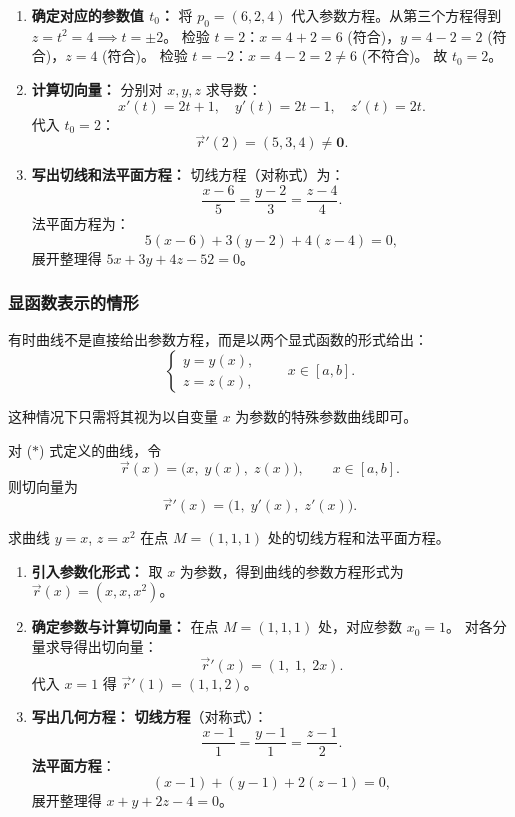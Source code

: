 \documentclass[lang=cn,11pt]{elegantbook}
\begin{document}
\begin{solution}
\begin{enumerate}
  \item \textbf{确定对应的参数值 $t_0$：}
  将 $p_0=(6,2,4)$ 代入参数方程。从第三个方程得到 $z=t^2=4 \implies t=\pm 2$。
  检验 $t=2$：$x=4+2=6$ (符合)，$y=4-2=2$ (符合)，$z=4$ (符合)。
  检验 $t=-2$：$x=4-2=2 \neq 6$ (不符合)。
  故 $t_0=2$。

  \item \textbf{计算切向量：}
  分别对 $x, y, z$ 求导数：
  \[
  x'(t)=2t+1,\quad y'(t)=2t-1,\quad z'(t)=2t.
  \]
  代入 $t_0=2$：
  \[
  \vec{r}'(2)=(5,3,4) \neq \boldsymbol{0}.
  \]

  \item \textbf{写出切线和法平面方程：}
  切线方程（对称式）为：
  \[
  \boxed{\frac{x-6}{5}=\frac{y-2}{3}=\frac{z-4}{4}}.
  \]
  法平面方程为：
  \[
  5(x-6)+3(y-2)+4(z-4)=0,
  \]
  展开整理得 $\boxed{5x+3y+4z-52=0}$。
\end{enumerate}
\end{solution}

\subsubsection*{显函数表示的情形}

有时曲线不是直接给出参数方程，而是以两个显式函数的形式给出：
\[\begin{cases}y=y(x),\\z=z(x),\end{cases}\qquad x\in[a,b].\tag{$\ast$}\]

这种情况下只需将其视为以自变量 $x$ 为参数的特殊参数曲线即可。

\begin{definition}[显式曲线的参数化] \label{def:explicit-curve}
对 ($\ast$) 式定义的曲线，令
\[
\vec{r}(x)=\bigl(x,\;y(x),\;z(x)\bigr),\qquad x\in[a,b].
\]
则切向量为
\[
\boxed{\vec{r}'(x)=\bigl(1,\;y'(x),\;z'(x)\bigr).}
\]
\end{definition}

\begin{example}[显式曲线的切线与法平面] \label{ex:explicit-curve-ex}
求曲线 $y=x$, $z=x^2$ 在点 $M=(1,1,1)$ 处的切线方程和法平面方程。
\end{example}

\begin{solution}
\begin{enumerate}
  \item \textbf{引入参数化形式：}
  取 $x$ 为参数，得到曲线的参数方程形式为 $\vec{r}(x)=(x,x,x^2)$。

  \item \textbf{确定参数与计算切向量：}
  在点 $M=(1,1,1)$ 处，对应参数 $x_0=1$。
  对各分量求导得出切向量：
  \[
  \vec{r}'(x) = (1,\;1,\;2x).
  \]
  代入 $x=1$ 得 $\vec{r}'(1)=(1,1,2)$。

  \item \textbf{写出几何方程：}
  \textbf{切线方程}（对称式）：
  \[
  \boxed{\frac{x-1}{1}=\frac{y-1}{1}=\frac{z-1}{2}}.
  \]
  \textbf{法平面方程}：
  \[
  (x-1)+(y-1)+2(z-1)=0,
  \]
  展开整理得 $\boxed{x+y+2z-4=0}$。
\end{enumerate}
\end{solution}
\end{document}

